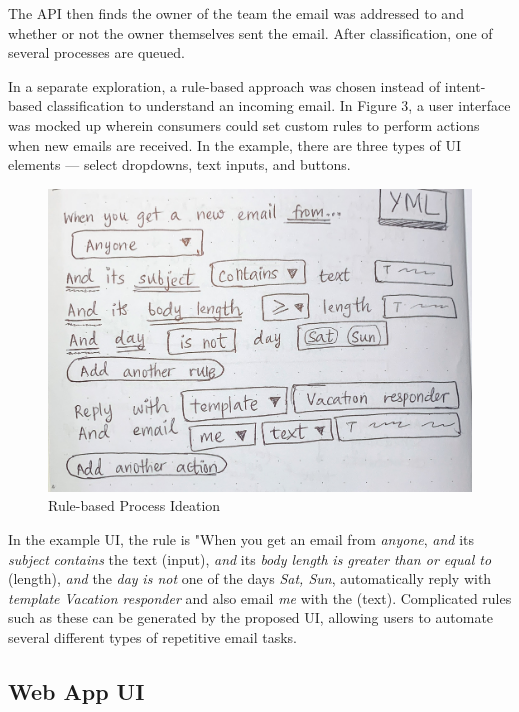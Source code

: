 \documentclass{article}
\begin{document}
The API then finds the owner of the team the email was addressed to and whether or not the owner themselves sent the email. After classification, one of several processes are queued.

In a separate exploration, a rule-based approach was chosen instead of intent-based classification to understand an incoming email. In Figure 3, a user interface was mocked up wherein consumers could set custom rules to perform actions when new emails are received. In the example, there are three types of UI elements --- select dropdowns, text inputs, and buttons.

\begin{figure}\centering
	\includegraphics[scale=0.092]{drawing-rules-ui.jpg}
	\caption{Rule-based Process Ideation}
\end{figure}

In the example UI, the rule is "When you get an email from \emph{anyone}, \emph{and} its \emph{subject} \emph{contains} the text (input), \emph{and} its \emph{body length} \emph{is greater than or equal to} (length), \emph{and} the \emph{day} \emph{is not} one of the days \emph{Sat, Sun}, automatically reply with \emph{template} \emph{Vacation responder} and also email \emph{me} with the (text). Complicated rules such as these can be generated by the proposed UI, allowing users to automate several different types of repetitive email tasks.

\subsection{Web App UI}
\end{document}
